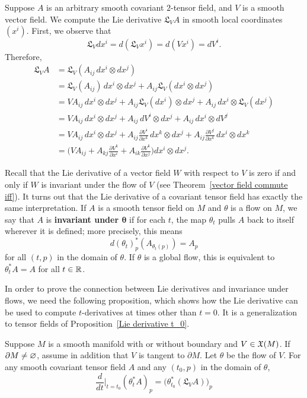 \begin{example}
Suppose $A$ is an arbitrary smooth covariant $2$-tensor field, and $V$ is a smooth vector field. We compute the Lie derivative $\mathfrak{L}_VA$ in smooth local coordinates $(x^i)$. First, we observe that \[\mathfrak{L}_Vdx^i=d(\mathfrak{L}_Vx^i)=d(Vx^i)=dV^i.\] 
Therefore,
\begin{align*}
\mathfrak{L}_VA&=\mathfrak{L}_V(A_{ij}\,dx^i\otimes dx^j)\\
&=\mathfrak{L}_V(A_{ij})\,dx^i\otimes dx^j+A_{ij}\mathfrak{L}_V(dx^i\otimes dx^j)\\
&=VA_{ij}\,dx^i\otimes dx^j+A_{ij}\mathfrak{L}_V(dx^i)\otimes dx^j+A_{ij}\,dx^i\otimes\mathfrak{L}_V(dx^j)\\
&=VA_{ij}\,dx^i\otimes dx^j+A_{ij}\,dV^i\otimes dx^j+A_{ij}\,dx^i\otimes dV^j\\
&=VA_{ij}\,dx^i\otimes dx^j+A_{ij}\frac{\partial V^i}{\partial x^k}\,dx^k\otimes dx^j+A_{ij}\frac{\partial V^j}{\partial x^k}\,dx^i\otimes dx^k\\
&=\Big(VA_{ij}+A_{kj}\frac{\partial V^k}{\partial x^i}+A_{ik}\frac{\partial V^k}{\partial x^j}\Big)dx^i\otimes dx^j.
\end{align*}
\end{example}
Recall that the Lie derivative of a vector field $W$ with respect to $V$ is zero if and
only if $W$ is invariant under the flow of $V$ (see Theorem~\ref{vector field commute iff}). It turns out that the Lie derivative of a covariant tensor field has exactly the same interpretation. If $A$ is a smooth tensor field on $M$ and $\theta$ is a flow on $M$, we say that $A$ is \textbf{invariant under $\bm{\theta}$} if for each $t$, the map $\theta_t$ pulls $A$ back to itself wherever it is defined; more precisely, this means
\[d(\theta_t)_p^*(A_{\theta_t(p)})=A_p\]
for all $(t,p)$ in the domain of $\theta$. If $\theta$ is a global flow, this is equivalent to $\theta_t^*A=A$ for all $t\in\mathbb{R}$.\par
In order to prove the connection between Lie derivatives and invariance under flows, we need the following proposition, which shows how the Lie derivative can be used to compute $t$-derivatives at times other than $t=0$. It is a generalization to tensor fields of Proposition~\ref{Lie derivative t_0}.
\begin{proposition}\label{Lie der tensor t_0}
Suppose $M$ is a smooth manifold with or without boundary and $V\in\mathfrak{X}(M)$. If $\partial M\neq\varnothing$, assume in addition that $V$ is tangent to $\partial M$. Let $\theta$ be the
flow of $V$. For any smooth covariant tensor field $A$ and any $(t_0,p)$ in the domain
of $\theta$,
\[\frac{d}{dt}\Big|_{t=t_0}(\theta_t^*A)_p=\big(\theta_{t_0}^*(\mathfrak{L}_VA)\big)_p\]
\end{proposition}
